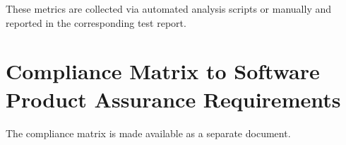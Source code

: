 \noindent
These metrics are collected via automated analysis scripts or manually and
reported in the corresponding test report.



\chapter{Compliance Matrix to Software Product Assurance Requirements}

The compliance matrix is made available as a separate document.






